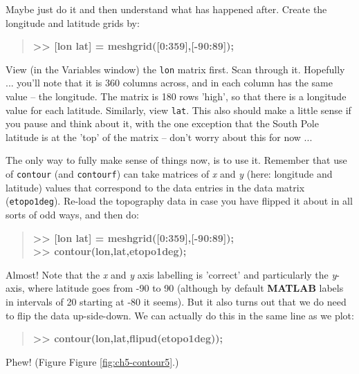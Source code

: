 \documentclass{tufte-book} %
\newenvironment{docspecbold}{\begin{quotation}\ttfamily\bfseries\parskip0pt\parindent0pt\ignorespaces}{\end{quotation}}
\begin{document}
Maybe just do it and then understand what has happened after. Create the longitude and latitude grids by:
\begin{docspecbold}
>> [lon lat] = meshgrid([0:359],[-90:89]);
\end{docspecbold}

View (in the \textsf{Variables window}) the \texttt{lon} matrix first. Scan through it. Hopefully ... you'll note that it is 360 columns across, and in each column has the same value -- the longitude. The matrix is 180 rows 'high', so that there is a longitude value for each latitude. Similarly, view \texttt{lat}. This also should make a little sense if you pause and think about it, with the one exception that the South Pole latitude is at the 'top' of the matrix -- don't worry about this for now ... 

The only way to fully make sense of things now, is to use it. Remember that use of \texttt{contour} (and \texttt{contourf}) can take matrices of \textit{x} and \textit{y} (here: longitude and latitude) values that correspond to the data entries in the data matrix (\texttt{etopo1deg}). Re-load the topography data in case you have flipped it about in all sorts of odd ways, and then do:
\begin{docspecbold}
>> [lon lat] = meshgrid([0:359],[-90:89]);
\\ >> contour(lon,lat,etopo1deg);
\end{docspecbold}
Almost! Note that the \textit{x} and \textit{y} axis labelling is 'correct' and particularly the \textit{y}-axis, where latitude goes from -90 to 90 (although by default \textbf{MATLAB} labels in intervals of 20 starting at -80 it seems). But it also turns out that we do need to flip the data up-side-down. We can actually do this in the same line as we plot:
\begin{docspecbold}
>> contour(lon,lat,flipud(etopo1deg));
\end{docspecbold}
Phew! (Figure Figure \ref{fig:ch5-contour5}.)
\end{document}
